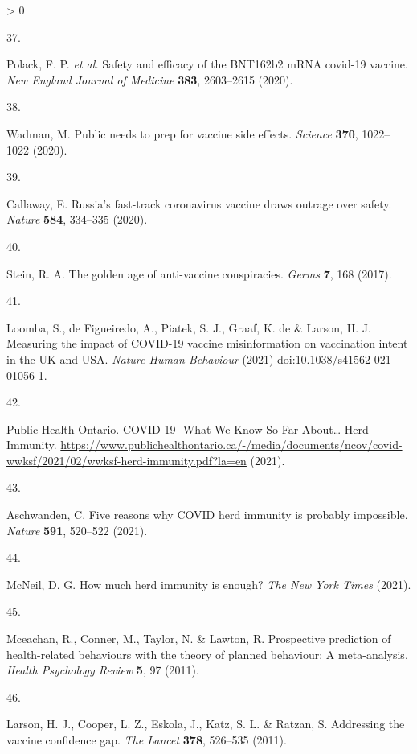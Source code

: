 \documentclass[
  12pt,
]{article}
\newlength{\cslhangindent}
\newlength{\csllabelwidth}
\newenvironment{CSLReferences}[2] %
 {%
  \setlength{\parindent}{0pt}
  \ifodd #1 \everypar{\setlength{\hangindent}{\cslhangindent}}\ignorespaces\fi
  \ifnum #2 > 0
  \setlength{\parskip}{#2\baselineskip}
  \fi
 }%
 {}
\newcommand{\CSLLeftMargin}[1]{\parbox[t]{\csllabelwidth}{#1}}
\newcommand{\CSLRightInline}[1]{\parbox[t]{\linewidth - \csllabelwidth}{#1}\break}
\begin{document}
\begin{CSLReferences}{0}{0}
\leavevmode\hypertarget{ref-polack2020safety}{}%
\CSLLeftMargin{37. }
\CSLRightInline{Polack, F. P. \emph{et al.} Safety and efficacy of the BNT162b2 mRNA covid-19 vaccine. \emph{New England Journal of Medicine} \textbf{383}, 2603--2615 (2020).}

\leavevmode\hypertarget{ref-wadman2020public}{}%
\CSLLeftMargin{38. }
\CSLRightInline{Wadman, M. Public needs to prep for vaccine side effects. \emph{Science} \textbf{370}, 1022--1022 (2020).}

\leavevmode\hypertarget{ref-callaway2020russia}{}%
\CSLLeftMargin{39. }
\CSLRightInline{Callaway, E. Russia's fast-track coronavirus vaccine draws outrage over safety. \emph{Nature} \textbf{584}, 334--335 (2020).}

\leavevmode\hypertarget{ref-stein2017golden}{}%
\CSLLeftMargin{40. }
\CSLRightInline{Stein, R. A. The golden age of anti-vaccine conspiracies. \emph{Germs} \textbf{7}, 168 (2017).}

\leavevmode\hypertarget{ref-loomba_measuring_2021}{}%
\CSLLeftMargin{41. }
\CSLRightInline{Loomba, S., de Figueiredo, A., Piatek, S. J., Graaf, K. de \& Larson, H. J. Measuring the impact of {COVID}-19 vaccine misinformation on vaccination intent in the {UK} and {USA}. \emph{Nature Human Behaviour} (2021) doi:\href{https://doi.org/10.1038/s41562-021-01056-1}{10.1038/s41562-021-01056-1}.}

\leavevmode\hypertarget{ref-ontario}{}%
\CSLLeftMargin{42. }
\CSLRightInline{Public Health Ontario. {COVID-19- What We Know So Far About\ldots{} Herd Immunity}. \url{https://www.publichealthontario.ca/-/media/documents/ncov/covid-wwksf/2021/02/wwksf-herd-immunity.pdf?la=en} (2021).}

\leavevmode\hypertarget{ref-aschwanden2021five}{}%
\CSLLeftMargin{43. }
\CSLRightInline{Aschwanden, C. Five reasons why COVID herd immunity is probably impossible. \emph{Nature} \textbf{591}, 520--522 (2021).}

\leavevmode\hypertarget{ref-mcneil_2021}{}%
\CSLLeftMargin{44. }
\CSLRightInline{McNeil, D. G. How much herd immunity is enough? \emph{The New York Times} (2021).}

\leavevmode\hypertarget{ref-mceachanetal2011}{}%
\CSLLeftMargin{45. }
\CSLRightInline{Mceachan, R., Conner, M., Taylor, N. \& Lawton, R. Prospective prediction of health-related behaviours with the theory of planned behaviour: A meta-analysis. \emph{Health Psychology Review} \textbf{5}, 97 (2011).}

\leavevmode\hypertarget{ref-larson2011addressing}{}%
\CSLLeftMargin{46. }
\CSLRightInline{Larson, H. J., Cooper, L. Z., Eskola, J., Katz, S. L. \& Ratzan, S. Addressing the vaccine confidence gap. \emph{The Lancet} \textbf{378}, 526--535 (2011).}


\end{CSLReferences}
\end{document}
